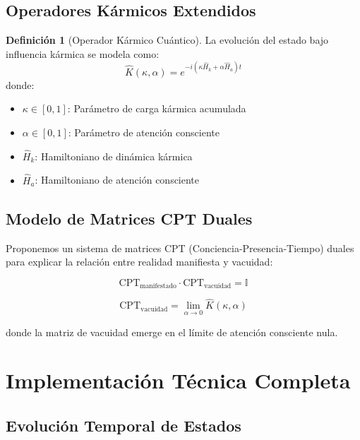 \documentclass[12pt,a4paper]{article}
\theoremstyle{definition}
\newtheorem{definition}{Definición}[section]
\begin{document}
\subsection{Operadores Kármicos Extendidos}

\begin{definition}[Operador Kármico Cuántico]
La evolución del estado bajo influencia kármica se modela como:
\begin{equation}
\hat{K}(\kappa, \alpha) = e^{-i(\kappa \hat{H}_k + \alpha \hat{H}_a)t}
\end{equation}
donde:
\begin{itemize}
    \item $\kappa \in [0,1]$: Parámetro de carga kármica acumulada
    \item $\alpha \in [0,1]$: Parámetro de atención consciente
    \item $\hat{H}_k$: Hamiltoniano de dinámica kármica
    \item $\hat{H}_a$: Hamiltoniano de atención consciente
\end{itemize}
\end{definition}

\subsection{Modelo de Matrices CPT Duales}

Proponemos un sistema de matrices CPT (Conciencia-Presencia-Tiempo) duales para explicar la relación entre realidad manifiesta y vacuidad:

\begin{equation}
\text{CPT}_{\text{manifestado}} \cdot \text{CPT}_{\text{vacuidad}} = \mathbb{I}
\end{equation}

\begin{equation}
\text{CPT}_{\text{vacuidad}} = \lim_{\alpha \to 0} \hat{K}(\kappa, \alpha)
\end{equation}

donde la matriz de vacuidad emerge en el límite de atención consciente nula.

\section{Implementación Técnica Completa}

\subsection{Evolución Temporal de Estados}
\end{document}
